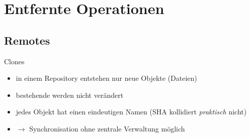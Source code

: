 \section{Entfernte Operationen}
\subsection{Remotes}
\begin{frame}{Clones}
    \begin{itemize}
        \item in einem Repository entstehen nur neue Objekte (Dateien)
        \item bestehende werden nicht verändert
        \item jedes Objekt hat einen eindeutigen Namen (SHA kollidiert
            \textit{praktisch} nicht)
        \item $\rightarrow$ Synchronisation ohne zentrale Verwaltung möglich
    \end{itemize}
\end{frame}

